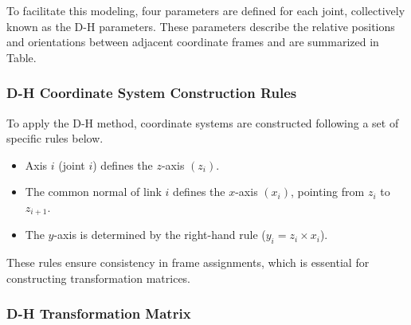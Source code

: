 \documentclass[conference]{IEEEtran}
\begin{document}
To facilitate this modeling, four parameters are defined for each joint, collectively known as the D-H parameters. These parameters describe the relative positions and orientations between adjacent coordinate frames and are summarized in Table.


\subsubsection{D-H Coordinate System Construction Rules}
To apply the D-H method, coordinate systems are constructed following a set of specific rules below. 

\begin{itemize}
	\item Axis $i$ (joint $i$) defines the $z$-axis $(z_i)$.
	\item The common normal of link $i$ defines the $x$-axis $(x_i)$, pointing from $z_i$ to $z_{i+1}$.
	\item The $y$-axis is determined by the right-hand rule ($y_i=z_i\times x_i$).
\end{itemize}

These rules ensure consistency in frame assignments, which is essential for constructing transformation matrices.

\subsubsection{D-H Transformation Matrix}
\end{document}
